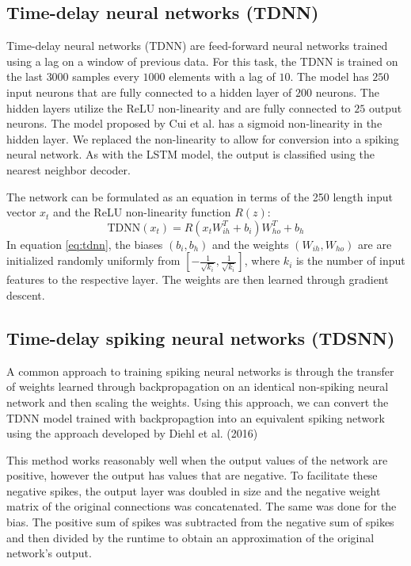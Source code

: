 \documentclass{article}
\begin{document}
\subsection*{Time-delay neural networks (TDNN)}

Time-delay neural networks (TDNN) are feed-forward neural networks trained using a lag on a window of previous data. \cite{waibel1995phoneme} For this task, the TDNN is trained on the last $3000$ samples every $1000$ elements with a lag of $10$. \cite{rojas1996backpropagation} The model has $250$ input neurons that are fully connected to a hidden layer of $200$ neurons. The hidden layers utilize the ReLU non-linearity and are fully connected to $25$ output neurons. The model proposed by Cui et al. has a sigmoid non-linearity in the hidden layer. We replaced the non-linearity to allow for conversion into a spiking neural network. As with the LSTM model, the output is classified using the nearest neighbor decoder.

The network can be formulated as an equation in terms of the 250 length input vector $x_t$ and the ReLU non-linearity function $R(z)$:
\begin{equation}
    \text{TDNN}(x_t) = R\left(x_tW_{ih}^T + b_i\right)W_{ho}^T + b_h
    \label{eq:tdnn}
\end{equation}
In equation \ref{eq:tdnn}, the biases $\left(b_i, b_h\right)$ and the weights $\left(W_{ih}, W_{ho}\right)$ are are initialized randomly uniformly from $\left[-\frac{1}{\sqrt{k_i}}, \frac{1}{\sqrt{k_i}}\right]$, where $k_i$ is the number of input features to the respective layer. The weights are then learned through gradient descent.

\subsection*{Time-delay spiking neural networks (TDSNN)}

A common approach to training spiking neural networks is through the transfer of weights learned through backpropagation on an identical non-spiking neural network and then scaling the weights. \cite{diehl2015fast} Using this approach, we can convert the TDNN model trained with backpropagtion into an equivalent spiking network using the approach developed by Diehl et al. (2016)

This method works reasonably well when the output values of the network are positive, however the output has values that are negative. To facilitate these negative spikes, the output layer was doubled in size and the negative weight matrix of the original connections was concatenated. The same was done for the bias. The positive sum of spikes was subtracted from the negative sum of spikes and then divided by the runtime to obtain an approximation of the original network's output.
\end{document}
